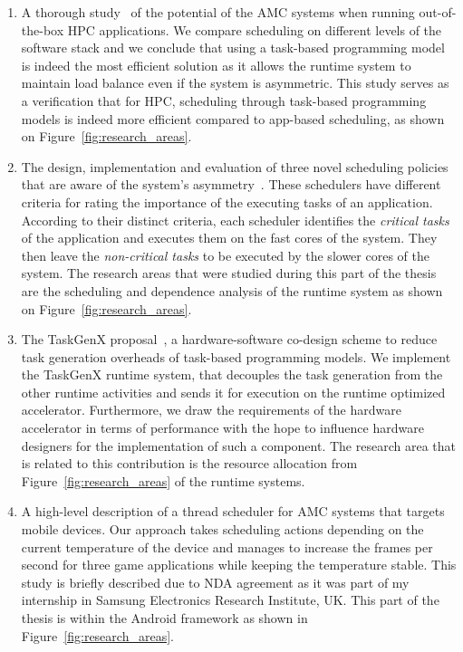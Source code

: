 \begin{enumerate}
	\item A thorough study~\cite{PACT_poster} of the potential of the AMC systems when running out-of-the-box HPC applications.
	We compare scheduling on different levels of the software stack and we conclude that using a task-based programming model is indeed the most efficient solution as it allows the runtime system to maintain load balance even if the system is asymmetric.
	This study serves as a verification that for HPC, scheduling through task-based programming models is indeed more efficient compared to app-based scheduling, as shown on Figure~\ref{fig:research_areas}.
	\item The design, implementation and evaluation of three novel scheduling policies that are aware of the system's asymmetry~\cite{Chronaki:ICS2015,Chronaki:TPDS}.
	These schedulers have different criteria for rating the importance of the executing tasks of an application.
	According to their distinct criteria, each scheduler identifies the \textit{critical tasks} of the application and executes them on the fast cores of the system. 
	They then leave the \textit{non-critical tasks} to be executed by the slower cores of the system.
	The research areas that were studied during this part of the thesis are the scheduling and dependence analysis of the runtime system as shown on Figure~\ref{fig:research_areas}.
	\item The TaskGenX proposal~\cite{Chronaki:ISC}, a hardware-software co-design scheme to reduce task generation overheads of task-based programming models.
	We implement the TaskGenX runtime system, that decouples the task generation from the other runtime activities and sends it for execution on the runtime optimized accelerator.
	Furthermore, we draw the requirements of the hardware accelerator in terms of performance with the hope to influence hardware designers for the implementation of such a component.
	The research area that is related to this contribution is the resource allocation from Figure~\ref{fig:research_areas} of the runtime systems.
	\item A high-level description of a thread scheduler for AMC systems that targets mobile devices.
	Our approach takes scheduling actions depending on the current temperature of the device and manages to increase the frames per second for three game applications while keeping the temperature stable.
	This study is briefly described due to NDA agreement as it was part of my internship in Samsung Electronics Research Institute, UK.
	This part of the thesis is within the Android framework as shown in Figure~\ref{fig:research_areas}.
\end{enumerate}


